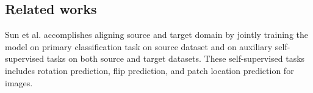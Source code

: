 \documentclass[conference]{IEEEtran}
\begin{document}
\subsection{Related works}

Sun et al. \cite{sun2019unsupervised} accomplishes aligning source and target domain by jointly training the model on primary classification task on source dataset and on auxiliary self-supervised tasks on both source and target datasets. These self-supervised tasks includes rotation prediction, flip prediction, and patch location prediction for images.

\clearpage


\end{document}
